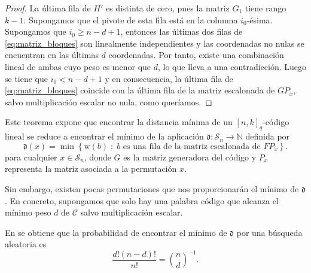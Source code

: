 \begin{proof}
    La última fila de $H'$ es distinta de cero, pues la matriz $G_1$ tiene rango $k-1$. Supongamos que el pivote de esta fila está en la columna $i_0$-ésima. Supongamos que $i_0 \geq n - d + 1$, entonces las últimas dos filas de \eqref{eq:matriz_bloques} son linealmente independientes y las coordenadas no nulas se encuentran en las últimas $d$ coordenadas. Por tanto, existe una combinación lineal de ambas cuyo peso es menor que $d$, lo que lleva a una contradicción. Luego se tiene que $i_0 < n - d + 1$ y en consecuencia, la última fila de \eqref{eq:matriz_bloques} coincide con la última fila de la matriz escalonada de $GP_x$, salvo multiplicación escalar no nula, como queríamos.
\end{proof}

Este teorema expone que encontrar la distancia mínima de un $[n, k]_q$-código lineal se reduce a encontrar el mínimo de la aplicación $\mathfrak d : \mathcal{S}_n \rightarrow \mathbb{N}$ definida por
\[
    \mathfrak d (x) = \min \left\{ \text{w}(b) \; : \; b \text{ es una fila de la matriz escalonada de } FP_x \right\}.
\]
para cualquier $x \in \mathcal{S}_n$, donde $G$ es la matriz generadora del código y $P_x$ representa la matriz asociada a la permutación $x$.

Sin embargo, existen pocas permutaciones que nos proporcionarán el mínimo de $\mathfrak{d}$. En concreto, supongamos que solo hay una palabra código que alcanza el mínimo peso $d$ de $\mathcal{C}$ salvo multiplicación escalar.

En \cite{Cuellar_etal} se obtiene que la probabilidad de encontrar el mínimo de $\mathfrak{d}$ por una búsqueda aleatoria es
\[
    \frac{d! (n-d)!}{n!} = {n \choose d}^{-1}.
\]

